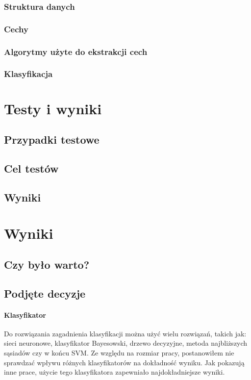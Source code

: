 \documentclass[a4paper,12pt,twoside,openany]{report}
\begin{document}
\subsection{Struktura danych}
\subsection{Cechy}
\subsection{Algorytmy użyte do ekstrakcji cech}
\subsection{Klasyfikacja}

\chapter{Testy i wyniki}
\section{Przypadki testowe}
\section{Cel testów}
\section{Wyniki}

\chapter{Wyniki}
\section{Czy było warto?}
\section{Podjęte decyzje}
\subsubsection{Klasyfikator}
Do rozwiązania zagadnienia klasyfikacji można użyć wielu rozwiązań, takich jak: sieci neuronowe, klasyfikator Bayesowski, drzewo decyzyjne, metoda najbliższych sąsiadów czy w końcu SVM. Ze względu na rozmiar pracy, postanowiłem nie sprawdzać wpływu różnych klasyfikatorów na dokładność wyniku. Jak pokazują inne prace, użycie tego klasyfikatora zapewniało najdokładniejsze wyniki.
\end{document}
